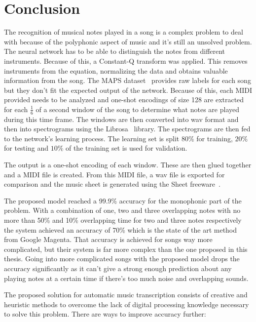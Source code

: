 \newpage
\chapter{Conclusion}

The recognition of musical notes played in a song is a complex problem to deal with because of the polyphonic aspect of music and it's still an unsolved problem. The neural network has to be able to distinguish the notes from different instruments. Because of this, a Constant-Q transform was applied. This removes instruments from the equation, normalizing the data and obtains valuable information from the song. The MAPS dataset~\cite{maps} provides raw labels for each song but they don't fit the expected output of the network. Because of this, each MIDI provided needs to be analyzed and one-shot encodings of size 128 are extracted for each $\frac{1}{6}$ of a second window of the song to determine what notes are played during this time frame. The windows are then converted into wav format and then into spectrograms using the Librosa~\cite{librosa} library. The spectrograms are then fed to the network's learning process. The learning set is split $80\%$ for training, $20\%$ for testing and $10\%$ of the training set is used for validation.

\par
The output is a one-shot encoding of each window. These are then glued together and a MIDI file is created. From this MIDI file, a wav file is exported for comparison and the music sheet is generated using the Sheet freeware~\cite{sheet}. 

\par
The proposed model reached a 99.9\% accuracy for the monophonic part of the problem. With a combination of one, two and three overlapping notes with no more than 50\% and 10\% overlapping time for two and three notes respectively the system achieved an accuracy of 70\% which is the state of the art method from Google Magenta. That accuracy is achieved for songs way more complicated, but their system is far more complex than the one proposed in this thesis. Going into more complicated songs with the proposed model drops the accuracy significantly as it can't give a strong enough prediction about any playing notes at a certain time if there's too much noise and overlapping sounds.

\par

The proposed solution for automatic music transcription consists of creative and heuristic methods to overcome the lack of digital processing knowledge necessary to solve this problem. There are ways to improve accuracy further:

